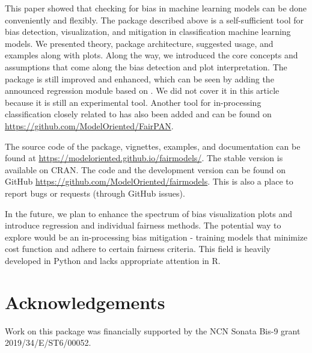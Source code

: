 This paper showed that checking for bias in machine learning models can
be done conveniently and flexibly. The package 
described above is a self-sufficient tool for bias detection,
visualization, and mitigation in classification machine learning models.
We presented theory, package architecture, suggested usage, and examples
along with plots. Along the way, we introduced the core concepts and
assumptions that come along the bias detection and plot interpretation.
The package is still improved and enhanced, which can be seen by adding
the announced regression module based on \citet{regression}. We did not
cover it in this article because it is still an experimental tool.
Another tool for in-processing classification closely related to
 has also been added and can be found on
\url{https://github.com/ModelOriented/FairPAN}.

The source code of the package, vignettes, examples, and documentation
can be found at \url{https://modeloriented.github.io/fairmodels/}. The
stable version is available on CRAN. The code and the development
version can be found on GitHub
\url{https://github.com/ModelOriented/fairmodels}. This is also a place
to report bugs or requests (through GitHub issues).

In the future, we plan to enhance the spectrum of bias visualization
plots and introduce regression and individual fairness methods. The
potential way to explore would be an in-processing bias mitigation -
training models that minimize cost function and adhere to certain
fairness criteria. This field is heavily developed in Python and lacks
appropriate attention in R.

\hypertarget{acknowledgements}{%
\section*{Acknowledgements}\label{acknowledgements}}

Work on this package was financially supported by the NCN Sonata Bis-9
grant 2019/34/E/ST6/00052.



\address{%
Jakub Wiśniewski\\
Warsaw University of Technology\\%
Faculty of Mathematics and Information Science\\ Poland\\
%
%
%
\href{mailto:jakwisn@gmail.com}{\nolinkurl{jakwisn@gmail.com}}%
}

